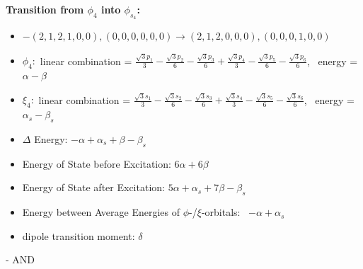 \documentclass[12pt,a4paper]{article}
\begin{document}
        \noindent\textbf{Transition from $\phi_{4}$ into $\phi_{s_{4}}$:}
        \begin{itemize}
            \item $- (2, 1, 2, 1, 0, 0), (0, 0, 0, 0, 0, 0) \rightarrow (2, 1, 2, 0, 0, 0), (0, 0, 0, 1, 0, 0)$
        
            \item $\phi_{4}:$ linear combination = $\frac{\sqrt{3} p_{1}}{3} - \frac{\sqrt{3} p_{2}}{6} - \frac{\sqrt{3} p_{3}}{6} + \frac{\sqrt{3} p_{4}}{3} - \frac{\sqrt{3} p_{5}}{6} - \frac{\sqrt{3} p_{6}}{6}$, \
            energy = $\alpha - \beta$
            
            \item $\xi_{4}:$ linear combination = $\frac{\sqrt{3} s_{1}}{3} - \frac{\sqrt{3} s_{2}}{6} - \frac{\sqrt{3} s_{3}}{6} + \frac{\sqrt{3} s_{4}}{3} - \frac{\sqrt{3} s_{5}}{6} - \frac{\sqrt{3} s_{6}}{6}$, \
            energy = $\alpha_{s} - \beta_{s}$
            
            \item $\Delta$ Energy: $- \alpha + \alpha_{s} + \beta - \beta_{s}$
            \item Energy of State before Excitation: $6 \alpha + 6 \beta$
            \item Energy of State after Excitation: $5 \alpha + \alpha_{s} + 7 \beta - \beta_{s}$
            \item Energy between Average Energies of $\phi$-/$\xi$-orbitals: \
            $- \alpha + \alpha_{s}$
        
            \item dipole transition moment: $\delta$
        
        \end{itemize}
        
 -  AND 
\end{document}
